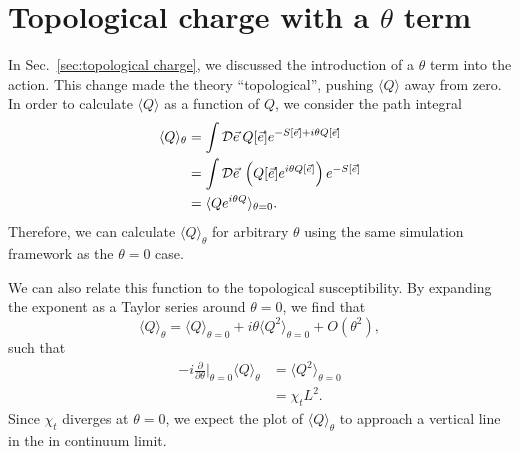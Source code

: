 \section{Topological charge with a $\theta$ term}
\label{sec:topotheta}
In Sec.~\ref{sec:topological charge}, we discussed the introduction of a $\theta$ term into the action. This change made the theory ``topological'', pushing $\langle Q \rangle$ away from zero. In order to calculate $\langle Q \rangle$ as a function of $Q$, we consider the path integral
\begin{align}
    \langle Q \rangle_\theta &=\int \mathcal{D}\vec e\:Q[\vec e]e^{-S[\vec e]+i\theta Q[\vec e]} \\
                             &=\int \mathcal{D}\vec e\:\left( Q[\vec e]e^{i\theta Q[\vec e]} \right) e^{-S[\vec e]} \\
                             &=\langle Q e^{i \theta Q} \rangle_{\theta=0}.
\end{align}
Therefore, we can calculate $\langle Q \rangle_\theta$ for arbitrary $\theta$ using the same simulation framework as the $\theta=0$ case.

We can also relate this function to the topological susceptibility. By expanding the exponent as a Taylor series around $\theta=0$, we find that  
\begin{equation}
    \langle Q \rangle_\theta = \langle Q \rangle_{\theta=0} + i \theta \langle Q^2 \rangle_{\theta=0} + O(\theta^2),
\end{equation}
such that 
\begin{align}
    -i \frac{\partial}{\partial \theta}\Big|_{\theta=0} \langle Q \rangle_\theta &= \langle Q^2 \rangle_{\theta=0}\\
                                                              &= \chi_t L^2.
\end{align}
Since $\chi_t$ diverges at $\theta=0$, we expect the plot of $\langle Q\rangle_\theta$ to approach a vertical line in the in continuum limit. 

